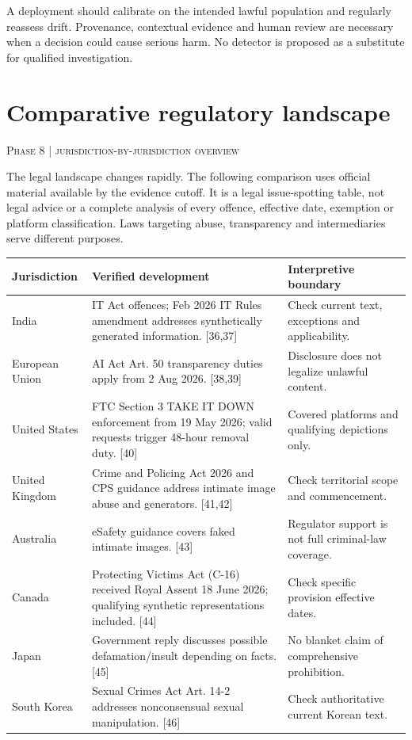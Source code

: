 \documentclass[10pt,a4paper]{article}
\newcommand{\sect}[2]{\Needspace{6\baselineskip}\section{#1}\textcolor{muted}{\small\textsc{#2}}\par\vspace{2mm}}
\begin{document}
A deployment should calibrate on the intended lawful population and regularly reassess drift. Provenance, contextual evidence and human review are necessary when a decision could cause serious harm. No detector is proposed as a substitute for qualified investigation. \cite{nist,genimage}


\sect{Comparative regulatory landscape}{Phase 8 | jurisdiction-by-jurisdiction overview}

The legal landscape changes rapidly. The following comparison uses official material available by the evidence cutoff. It is a legal issue-spotting table, not legal advice or a complete analysis of every offence, effective date, exemption or platform classification. Laws targeting abuse, transparency and intermediaries serve different purposes.


\begin{center}\small\begin{tabularx}{\linewidth}{@{}>{\RaggedRight\arraybackslash}p{.19\linewidth}>{\RaggedRight\arraybackslash}p{.46\linewidth}>{\RaggedRight\arraybackslash}p{.28\linewidth}@{}}\toprule
\textbf{Jurisdiction} & \textbf{Verified development} & \textbf{Interpretive boundary}\\\midrule
India & IT Act offences; Feb 2026 IT Rules amendment addresses synthetically generated information. [36,37] & Check current text, exceptions and applicability.\\
European Union & AI Act Art. 50 transparency duties apply from 2 Aug 2026. [38,39] & Disclosure does not legalize unlawful content.\\
United States & FTC Section 3 TAKE IT DOWN enforcement from 19 May 2026; valid requests trigger 48-hour removal duty. [40] & Covered platforms and qualifying depictions only.\\
United Kingdom & Crime and Policing Act 2026 and CPS guidance address intimate image abuse and generators. [41,42] & Check territorial scope and commencement.\\
Australia & eSafety guidance covers faked intimate images. [43] & Regulator support is not full criminal-law coverage.\\
Canada & Protecting Victims Act (C-16) received Royal Assent 18 June 2026; qualifying synthetic representations included. [44] & Check specific provision effective dates.\\
Japan & Government reply discusses possible defamation/insult depending on facts. [45] & No blanket claim of comprehensive prohibition.\\
South Korea & Sexual Crimes Act Art. 14-2 addresses nonconsensual sexual manipulation. [46] & Check authoritative current Korean text.\\\bottomrule\end{tabularx}\end{center}
\end{document}
